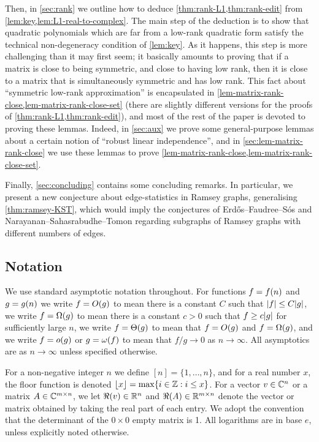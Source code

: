 \documentclass{daj}
\theoremstyle{plain}
\theoremstyle{plain}
\theoremstyle{plain}
\theoremstyle{plain}
\theoremstyle{definition}
\theoremstyle{plain}
\theoremstyle{plain}
\theoremstyle{definition}
\theoremstyle{definition}
\theoremstyle{plain}
\let\originalleft\left
\let\originalright\right
\renewcommand{\left}{\mathopen{}\mathclose\bgroup\originalleft}
\renewcommand{\right}{\aftergroup\egroup\originalright}
\begin{document}
Then, in \cref{sec:rank} we outline how to deduce \cref{thm:rank-L1,thm:rank-edit} from \cref{lem:key,lem:L1-real-to-complex}. The main step of the deduction is to show that quadratic polynomials which are far from
a low-rank quadratic form satisfy the technical non-degeneracy condition of \cref{lem:key}. As it happens, this step is more challenging than it may first seem; it basically amounts to proving that if a matrix is close to being symmetric, and close to having low rank, then it is close to a matrix
that is simultaneously symmetric and has low rank. This fact about ``symmetric low-rank approximation'' is encapsulated in \cref{lem-matrix-rank-close,lem-matrix-rank-close-set} (there are slightly different versions for the proofs of \cref{thm:rank-L1,thm:rank-edit}), and most of the rest of the paper is devoted to proving these lemmas. Indeed, in \cref{sec:aux} we prove some general-purpose lemmas about a certain notion of ``robust linear independence'', and in \cref{sec:lem-matrix-rank-close} we use these lemmas to prove \cref{lem-matrix-rank-close,lem-matrix-rank-close-set}.

Finally, \cref{sec:concluding} contains some concluding remarks. In particular, we
present a new conjecture about edge-statistics in Ramsey graphs, generalising
\cref{thm:ramsey-KST}, which would imply the conjectures of Erd\H os--Faudree--S\'os
and Narayanan--Sahasrabudhe--Tomon regarding subgraphs of Ramsey
graphs with different numbers of edges.


\subsection{Notation}

We use standard asymptotic notation throughout. For functions $f=f\left(n\right)$
and $g=g\left(n\right)$ we write $f=O\left(g\right)$ to mean there
is a constant $C$ such that $\left|f\right|\le C\left|g\right|$,
we write $f=\Omega\left(g\right)$ to mean there is a constant $c>0$
such that $f\ge c\left|g\right|$ for sufficiently large $n$, we
write $f=\Theta\left(g\right)$ to mean that $f=O\left(g\right)$
and $f=\Omega\left(g\right)$, and we write $f=o\left(g\right)$ or
$g=\omega\left(f\right)$ to mean that $f/g\to0$ as $n\to\infty$.
All asymptotics are as $n\to\infty$ unless specified otherwise.

For a non-negative integer $n$ we define $[n]=\lbrace 1,\dots, n\rbrace$, and for a real number $x$, the floor function is denoted $\floor x=\max\left\{ i\in\ZZ: i\le x\right\} $. For a vector $v\in \mathbb{C}^n$ or a matrix $A\in \mathbb{C}^{m\times n}$, we let $\Re(v)\in \mathbb{R}^n$ and $\Re(A)\in \mathbb{R}^{m\times n}$ denote the vector or matrix obtained by taking the real part of each entry. We adopt the convention that the determinant of the $0\times 0$ empty matrix is 1. All logarithms are in base $e$, unless explicitly noted otherwise.
\end{document}
